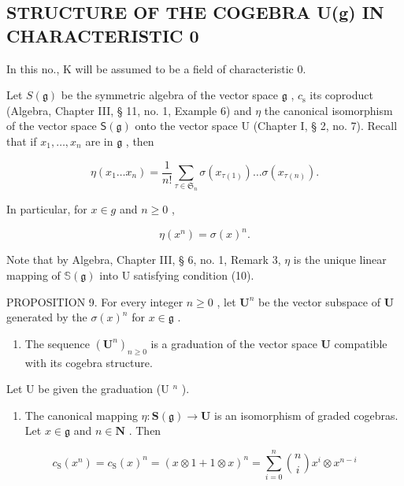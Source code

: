 \subsection{STRUCTURE OF THE COGEBRA U(g) IN CHARACTERISTIC 0}

In this no., K will be assumed to be a field of characteristic 0.

Let \(S(\mathfrak{g})\) be the symmetric algebra of the vector space \(\mathfrak{g}\) , \(c_{\mathrm{s}}\) its coproduct (Algebra, Chapter III, § 11, no. 1, Example 6) and \(\eta\) the canonical isomorphism of the vector space \(\mathsf{S}(\mathfrak{g})\) onto the vector space U (Chapter I, § 2, no. 7). Recall that if \(x_{1},\ldots ,x_{n}\) are in \(\mathfrak{g}\) , then

\[
\eta (x _ {1} \dots x _ {n}) = \frac {1}{n !} \sum_ {\tau \in \mathfrak {S} _ {n}} \sigma (x _ {\tau (1)}) \dots \sigma (x _ {\tau (n)}).\tag{9}
\]

In particular, for \(x \in g\) and \(n \geqslant 0\) ,

\[
\eta (x ^ {n}) = \sigma (x) ^ {n}.\tag{10}
\]

Note that by Algebra, Chapter III, § 6, no. 1, Remark 3, \(\eta\) is the unique linear mapping of \(\mathbb{S}(\mathfrak{g})\) into U satisfying condition (10).

PROPOSITION 9. For every integer \(n \geqslant 0\) , let \(\mathbf{U}^n\) be the vector subspace of \(\mathbf{U}\) generated by the \(\sigma(x)^n\) for \(x \in \mathfrak{g}\) .

\begin{enumerate}
\def\labelenumi{(\alph{enumi})}
\tightlist
\item
  The sequence \((\mathbf{U}^n)_{n\geqslant 0}\) is a graduation of the vector space \(\mathbf{U}\) compatible with its cogebra structure.
\end{enumerate}

Let U be given the graduation (U \(^{n}\) ).

\begin{enumerate}
\def\labelenumi{(\alph{enumi})}
\setcounter{enumi}{1}
\tightlist
\item
  The canonical mapping \(\eta: \mathbf{S}(\mathfrak{g}) \to \mathbf{U}\) is an isomorphism of graded cogebras. Let \(x \in \mathfrak{g}\) and \(n \in \mathbf{N}\) . Then
\end{enumerate}

\[
c _ {\mathrm{S}} (x ^ {n}) = c _ {\mathrm{S}} (x) ^ {n} = (x \otimes 1 + 1 \otimes x) ^ {n} = \sum_ {i = 0} ^ {n} {\binom {n} {i}} x ^ {i} \otimes x ^ {n - i}\tag{11}
\]

